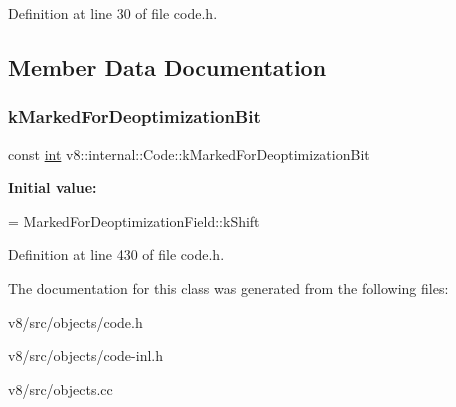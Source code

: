 Definition at line 30 of file code.\+h.



\subsection{Member Data Documentation}
\mbox{\label{classv8_1_1internal_1_1Code_a407472d202e070f89c3bd23a485d67be}} 
\subsubsection{\texorpdfstring{k\+Marked\+For\+Deoptimization\+Bit}{kMarkedForDeoptimizationBit}}
{\footnotesize\ttfamily const \mbox{\hyperlink{classint}{int}} v8\+::internal\+::\+Code\+::k\+Marked\+For\+Deoptimization\+Bit\hspace{0.3cm}{\ttfamily [static]}}

{\bfseries Initial value\+:}
\begin{DoxyCode}
=
      MarkedForDeoptimizationField::kShift
\end{DoxyCode}


Definition at line 430 of file code.\+h.



The documentation for this class was generated from the following files\+:\begin{DoxyCompactItemize}
\item 
v8/src/objects/code.\+h\item 
v8/src/objects/code-\/inl.\+h\item 
v8/src/objects.\+cc\end{DoxyCompactItemize}
